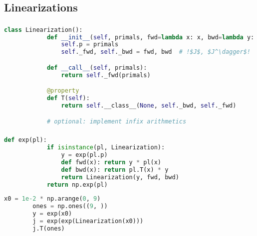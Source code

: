 \documentclass[aspectratio=169,xcolor=dvipsnames]{beamer}
\begin{document}
\subsection{Linearizations}
\begin{frame}[fragile]
	\frametitle{\insertsection}
	\framesubtitle{\insertsubsection}

	\begin{lstlisting}[language=python,escapechar=!]
		class Linearization():
			def __init__(self, primals, fwd=lambda x: x, bwd=lambda y: y):
				self.p = primals
				self._fwd, self._bwd = fwd, bwd  # !$J$, $J^\dagger$!

			def __call__(self, primals):
				return self._fwd(primals)

			@property
			def T(self):
				return self.__class__(None, self._bwd, self._fwd)

			# optional: implement infix arithmetics
	\end{lstlisting}

\end{frame}

\begin{frame}[fragile]
	\frametitle{\insertsection}
	\framesubtitle{\insertsubsection}

	\begin{lstlisting}[language=python,escapechar=!]
		def exp(pl):
			if isinstance(pl, Linearization):
				y = exp(pl.p)
				def fwd(x): return y * pl(x)
				def bwd(x): return pl.T(x) * y
				return Linearization(y, fwd, bwd)
			return np.exp(pl)
	\end{lstlisting}

	\begin{lstlisting}[language=python,escapechar=!]
		x0 = 1e-2 * np.arange(0, 9)
		ones = np.ones((9, ))
		y = exp(x0)
		j = exp(exp(Linearization(x0)))
		j.T(ones)
	\end{lstlisting}

\end{frame}
\end{document}
